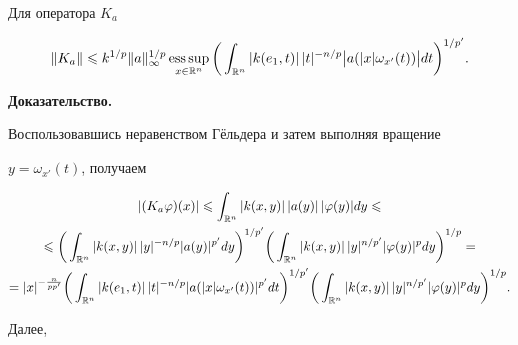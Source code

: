 \begin{lem}\label{l2.2}


Для оператора $K_a$


\begin{equation}


\|K_a\|\leqslant k^{1/p}\|a\|_\infty^{1/p}


\esssup_{x\in\Bbb R^n}


\bigg(\int_{\Bbb R^n}


|k(e_1,t)|\,|t|^{-n/p}


\big|a(|x|\omega_{x'}(t))\big|dt\bigg)^{1/p'}.


\label{2.6}


\end{equation}


\end{lem}





{\bf Доказательство.}


Воспользовавшись неравенством Г\"ельдера и затем выполняя вращение


$y=\omega_{x'}(t)$, получаем


\begin{multline*}


|(K_a\varphi)(x)|\leqslant


\int_{\Bbb R^n}|k(x,y)|\,|a(y)|\,|\varphi(y)|dy \leqslant\\


%


\leqslant\bigg(\int_{\Bbb R^n}|k(x,y)|\,|y|^{-n/p}


|a(y)|^{p'}dy\bigg)^{1/p'}\bigg(\int_{\Bbb R^n}|k(x,


y)|\,|y|^{n/p'}|\varphi(y)|^pdy\bigg)^{1/p}=\\


%


= |x|^{-\frac{n}{pp'}}\bigg(\int_{\Bbb R^n}|k(e_1,


t)|\,|t|^{-n/p}|a(|x|\omega_{x'}(t))|^{p'}dt\bigg)^{1/p'}


\bigg(\int_{\Bbb R^n}|k(x,


y)|\,|y|^{n/p'}|\varphi(y)|^p dy\bigg)^{1/p}.


\end{multline*}


Далее,


